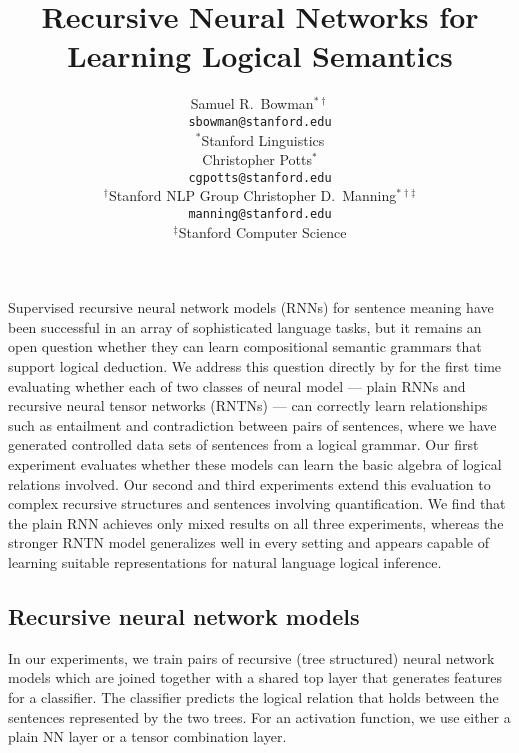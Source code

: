 \documentclass{article} %
\title{Recursive Neural Networks for Learning Logical Semantics}
\author{
Samuel R.\ Bowman$^{\ast\dag}$ \\
\texttt{sbowman@stanford.edu} \\[2ex]
$^{\ast}$Stanford Linguistics \\
\And
Christopher Potts$^{\ast}$\\
\texttt{cgpotts@stanford.edu} \\[2ex]
$^{\dag}$Stanford NLP Group
\And
Christopher D.\ Manning$^{\ast\dag\ddag}$\\
\texttt{manning@stanford.edu}\\[2ex]
$^{\ddag}$Stanford Computer Science
}
\def\ii#1{\textit{#1}}
\begin{document}
\maketitle


  Supervised recursive neural network models (RNNs) for sentence
  meaning have been successful in an array of sophisticated language
  tasks, but it remains an open question whether they can learn
  compositional semantic grammars that support logical deduction.  We
  address this question directly by for the first time evaluating
  whether each of two classes of neural model --- plain RNNs and
  recursive neural tensor networks (RNTNs) --- can correctly learn
  relationships such as entailment and contradiction between pairs of
  sentences, where we have generated controlled data sets of sentences
  from a logical grammar.  Our first experiment evaluates whether
  these models can learn the basic algebra of logical relations
  involved. Our second and third experiments extend this evaluation to
  complex recursive structures and sentences involving quantification.
  We find that the plain RNN achieves only mixed results on all three
  experiments, whereas the stronger RNTN model generalizes well in
  every setting and appears capable of learning suitable
  representations for natural language logical inference.

\subsection*{Recursive neural network models}

\begin{figure}[hp]
  \centering
  
  \label{sample-figure}
\end{figure}

In our experiments, we train pairs of recursive (tree structured) neural network models \cite{socher2013acl1} which are joined together with a shared top layer that generates features for a classifier. The classifier predicts the logical relation that holds between the sentences represented by the two trees. For an activation function, we use either a plain NN layer or a tensor combination layer.

\end{document}
